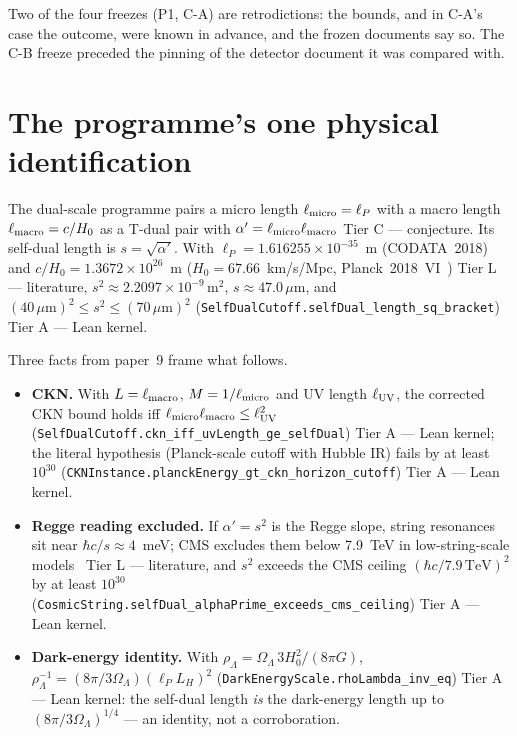 \documentclass[11pt,a4paper]{article}
\theoremstyle{remark}
\newcommand{\tierA}{\colorbox{green!15}{\textsf{\scriptsize Tier A --- Lean kernel}}}
\newcommand{\tierL}{\colorbox{blue!10}{\textsf{\scriptsize Tier L --- literature}}}
\newcommand{\tierC}{\colorbox{orange!15}{\textsf{\scriptsize Tier C --- conjecture}}}
\newcommand{\lean}[1]{\texttt{#1}}
\begin{document}
Two of the four freezes (P1, C-A) are retrodictions: the bounds, and in C-A's case the outcome, were known
in advance, and the frozen documents say so. The C-B freeze preceded the pinning of the detector document it
was compared with.

\section{The programme's one physical identification}
\label{sec:identification}

The dual-scale programme pairs a micro length $\ell_{\rm micro}=\ell_P$ with a macro length
$\ell_{\rm macro}=c/H_0$ as a T-dual pair with $\alpha'=\ell_{\rm micro}\ell_{\rm macro}$ \tierC. Its
self-dual length is $s=\sqrt{\alpha'}$. With $\ell_P=1.616255\times10^{-35}$~m (CODATA~2018) and
$c/H_0=1.3672\times10^{26}$~m ($H_0=67.66$~km/s/Mpc, Planck~2018~VI~\cite{Planck2018VI}) \tierL,
$s^2\approx2.2097\times10^{-9}\,\mathrm{m}^2$, $s\approx47.0\,\mu$m, and $(40\,\mu\mathrm{m})^2\le s^2\le
(70\,\mu\mathrm{m})^2$ (\lean{SelfDualCutoff.selfDual\_length\_sq\_bracket}) \tierA.

Three facts from paper~9 frame what follows.
\begin{itemize}
\item \textbf{CKN.} With $L=\ell_{\rm macro}$, $M=1/\ell_{\rm micro}$ and UV length $\ell_{\rm UV}$, the corrected
  CKN bound holds iff $\ell_{\rm micro}\ell_{\rm macro}\le\ell_{\rm UV}^2$
  (\lean{SelfDualCutoff.ckn\_iff\_uvLength\_ge\_selfDual}) \tierA; the literal hypothesis (Planck-scale cutoff with
  Hubble IR) fails by at least $10^{30}$ (\lean{CKNInstance.planckEnergy\_gt\_ckn\_horizon\_cutoff}) \tierA.
\item \textbf{Regge reading excluded.} If $\alpha'=s^2$ is the Regge slope, string resonances sit near
  $\hbar c/s\approx4$~meV; CMS excludes them below 7.9~TeV in low-string-scale models~\cite{CMS2020} \tierL,
  and $s^2$ exceeds the CMS ceiling $(\hbar c/7.9\,\mathrm{TeV})^2$ by at least $10^{30}$
  (\lean{CosmicString.selfDual\_alphaPrime\_exceeds\_cms\_ceiling}) \tierA.
\item \textbf{Dark-energy identity.} With $\rho_\Lambda=\Omega_\Lambda\,3H_0^2/(8\pi G)$,
  $\rho_\Lambda^{-1}=(8\pi/3\Omega_\Lambda)(\ell_P L_H)^2$ (\lean{DarkEnergyScale.rhoLambda\_inv\_eq}) \tierA: the
  self-dual length \emph{is} the dark-energy length up to $(8\pi/3\Omega_\Lambda)^{1/4}$ --- an identity, not a
  corroboration.
\end{itemize}
\end{document}
